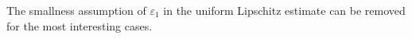 \documentclass[reqno,12pt]{amsart} %
\theoremstyle{definition}
\theoremstyle{remark}
\newtheorem{remark}[theorem]{Remark}
\numberwithin{equation}{section}
\newcommand{\e}{\varepsilon}
\begin{document}
The smallness assumption of $\e_1$ in the uniform Lipschitz estimate can be removed for the most interesting cases.

\end{document}
